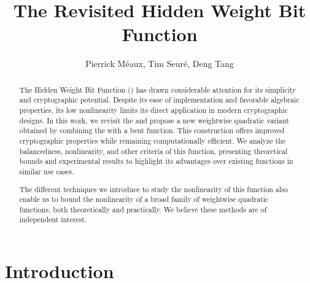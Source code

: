 \documentclass[11pt]{llncs}
\begin{document}
\setcounter{page}{1}

\title{The Revisited Hidden Weight Bit Function}

\ifnum{}
	\author{%
		Pierrick M\'eaux,
		Tim Seuré, 
		Deng Tang
	}
\else
	\author{}
	\institute{}
\fi

\maketitle	
	
\begin{abstract}
	The Hidden Weight Bit Function (\hwbf{}) has drawn considerable attention for its simplicity and cryptographic potential. 
	Despite its ease of implementation and favorable algebraic properties, its low nonlinearity limits its direct application in modern cryptographic designs. In this work, we revisit the \hwbf{} and propose a new weightwise quadratic variant obtained by combining the \hwbf{} with a bent function. 
	This construction offers improved cryptographic properties while remaining computationally efficient. We analyze the balancedness, nonlinearity, and other criteria of this function, presenting theoretical bounds and experimental results to highlight its advantages over existing functions in similar use cases. 
	
The different techniques we introduce to study the nonlinearity of this function also enable us to bound the nonlinearity of a broad family of weightwise quadratic functions, both theoretically and practically. We believe these methods are of independent interest.

		
	
\end{abstract}

\section{Introduction}
\end{document}
